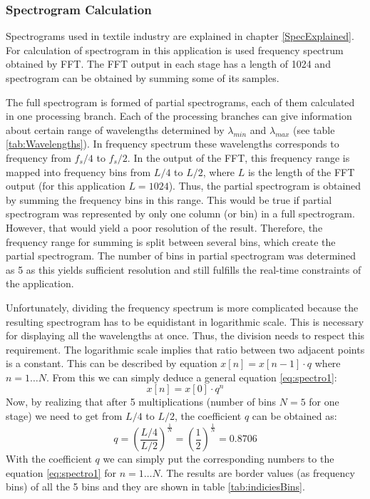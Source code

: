 \documentclass[twoside]{ctuthesis}
\theoremstyle{plain}
\theoremstyle{definition}
\theoremstyle{note}
\begin{document}
\subsubsection{Spectrogram Calculation}
Spectrograms used in textile industry are explained in chapter \ref{SpecExplained}. For calculation of spectrogram in this application is used frequency spectrum obtained by FFT. The FFT output in each stage has a length of 1024 and spectrogram can be obtained by summing some of its samples. 

The full spectrogram is formed of partial spectrograms, each of them calculated in one processing branch. Each of the processing branches can give information about certain range of wavelengths determined by $\lambda_{min}$ and $\lambda_{max}$ (see table \ref{tab:Wavelengths}). In frequency spectrum these wavelengths corresponds to frequency from $f_s/4$ to $f_s/2$. In the output of the FFT, this frequency range is mapped into frequency bins from $L/4$ to $L/2$, where $L$ is the length of the FFT output (for this application $L=1024$). Thus, the partial spectrogram is obtained by summing the frequency bins in this range. 
This would be true if partial spectrogram was represented by only one column (or bin) in a full spectrogram. However, that would yield a poor resolution of the result. Therefore, the frequency range for summing is split between several bins, which create the partial spectrogram. The number of bins in partial spectrogram was determined as 5 as this yields sufficient resolution and still fulfills the real-time constraints of the application. 

Unfortunately, dividing the frequency spectrum is more complicated because the resulting spectrogram has to be equidistant in logarithmic scale. This is necessary for displaying all the wavelengths at once. Thus, the division needs to respect this requirement. The logarithmic scale implies that ratio between two adjacent points is a constant. This can be described by equation $x[n]=x[n-1]\cdot q$ where $n=1\ldots N$.
From this we can simply deduce a general equation \ref{eq:spectro1}:
\begin{equation} \label{eq:spectro1}
	x[n]=x[0]\cdot q^n
\end{equation}
Now, by realizing that after 5 multiplications (number of bins $N=5$ for one stage) we need to get from $L/4$ to $L/2$, the coefficient $q$ can be obtained as:
\begin{equation} \label{eq:spectro2}
	q={\left(\frac{L/4}{L/2}\right)}^{\frac{1}{N}}={\left(\frac{1}{2}\right)}^{\frac{1}{N}}=0.8706
\end{equation}
With the coefficient $q$ we can simply put the corresponding numbers to the equation \ref{eq:spectro1} for $n=1\ldots N$. The results are border values (as frequency bins) of all the 5 bins and they are shown in table \ref{tab:indiciesBins}.
\end{document}
